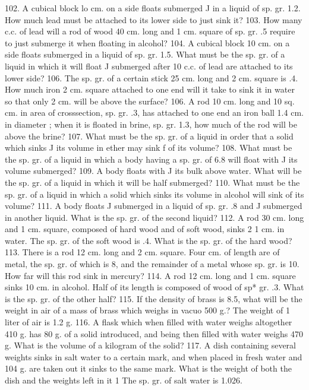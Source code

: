 102. A cubical block lo cm. on a side floats submerged J in a liquid of sp. gr. 1.2. How much lead must be attached to its lower side to just sink it?
103. How many c.c. of lead will a rod of wood 40 cm. long and 1 cm. square of sp. gr. .5 require to just submerge it when floating in alcohol?
104. A cubical block 10 cm. on a side floats \frac{}{} submerged in a liquid of sp. gr. 1.5. What must be the sp. gr. of a liquid in which it will float J submerged after 10 c.c. of lead are attached to its lower side?
106. The sp. gr. of a certain stick 25 cm. long and 2 cm. square is .4. How much iron 2 cm. square attached to one end will it take to sink it in water so that only 2 cm. will be above the surface?
106. A rod 10 cm. long and 10 sq. cm. in area of crosssection, sp. gr. .3, has attached to one end an iron ball 1.4 cm. in diameter ; when it is floated in brine, sp. gr. 1.3, how much of the rod will be above the brine?
107. What must be the sp. gr. of a liquid in order that a solid which sinks J its volume in ether may sink f of its volume?
108. What must be the sp. gr. of a liquid in which a body having a sp. gr. of 6.8 will float with J its volume submerged?
109. A body floats with J its bulk above water. What will be the sp. gr. of a liquid in which it will be half submerged?
110. What must be the sp. gr. of a liquid in which a solid which sinks \frac{}{} its volume in alcohol will sink \frac{}{} of its volume?
111. A body floats J submerged in a liquid of sp. gr. .8 and J submerged in another liquid. What is the sp. gr. of the second liquid?
112. A rod 30 cm. long and 1 cm. square, composed \frac{}{} of hard wood and \frac{}{} of soft wood, sinks 2 1 cm. in water. The sp. gr. of the soft wood is .4. What is the sp. gr. of the hard wood?
113. There is a rod 12 cm. long and 2 cm. square. Four cm. of length are of metal, the sp. gr. of which is 8, and the remainder of a metal whose sp. gr. is 10. How far will this rod sink in mercury?
114. A rod 12 cm. long and 1 cm. square sinks 10 cm. in alcohol. Half of its length is composed of wood of sp* gr. .3. What is the sp. gr. of the other half?
115. If the density of brass is 8.5, what will be the weight in air of a mass of brass which weighs in vacuo 500 g.? The weight of 1 liter of air is 1.2 g.
116. A flask which when filled with water weighs altogether 410 g. has 80 g. of a solid introduced, and being then filled with water weighs 470 g. What is the volume of a kilogram of the solid?
117. A dish containing several weights sinks in salt water to a certain mark, and when placed in fresh water and 104 g. are taken out it sinks to the same mark. What is the weight of both the dish and the weights left in it 1 The sp. gr. of salt water is 1.026.
